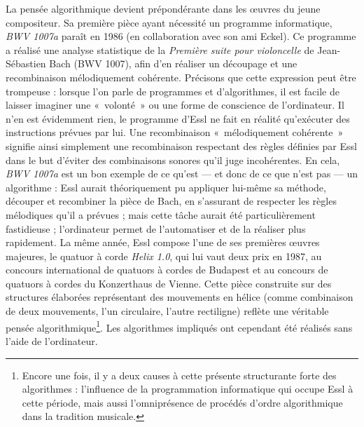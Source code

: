 \documentclass[a4paper,12pt]{article}
\newcommand{\guill}[1]{«~#1~»}
\begin{document}
La pensée algorithmique devient prépondérante dans les œuvres du jeune compositeur. Sa première pièce ayant nécessité un programme informatique, \emph{BWV 1007a} paraît en 1986 (en collaboration avec son ami Eckel). Ce programme a réalisé une analyse statistique de la \emph{Première suite pour violoncelle} de Jean-Sébastien Bach (BWV 1007), afin d'en réaliser un découpage et une recombinaison mélodiquement cohérente. Précisons que cette expression peut être trompeuse : lorsque l'on parle de programmes et d'algorithmes, il est facile de laisser imaginer une \guill{volonté} ou une forme de conscience de l'ordinateur. Il n'en est évidemment rien, le programme d'Essl ne fait en réalité qu'exécuter des instructions prévues par lui. Une recombinaison \guill{mélodiquement cohérente} signifie ainsi simplement une recombinaison respectant des règles définies par Essl dans le but d'éviter des combinaisons sonores qu'il juge incohérentes. En cela, \emph{BWV 1007a} est un bon exemple de ce qu'est --- et donc de ce que n'est pas --- un algorithme : Essl aurait théoriquement pu appliquer lui-même sa méthode, découper et recombiner la pièce de Bach, en s'assurant de respecter les règles mélodiques qu'il a prévues ; mais cette tâche aurait été particulièrement fastidieuse ; l'ordinateur permet de l'automatiser et de la réaliser plus rapidement. La même année, Essl compose l'une de ses premières œuvres majeures, le quatuor à corde \emph{Helix 1.0}, qui lui vaut deux prix en 1987, au concours international de quatuors à cordes de Budapest et au concours    de quatuors à cordes du Konzerthaus de Vienne. Cette pièce construite sur des structures élaborées représentant des mouvements en hélice (comme combinaison de deux mouvements, l'un circulaire, l'autre rectiligne) reflète une véritable pensée algorithmique\footnote{Encore une fois, il y a deux causes à cette présente structurante forte des algorithmes : l'influence de la programmation informatique qui occupe Essl à cette période, mais aussi l'omniprésence de procédés d'ordre algorithmique dans la tradition musicale.}. Les algorithmes impliqués ont cependant été réalisés sans l'aide de l'ordinateur.
\end{document}
